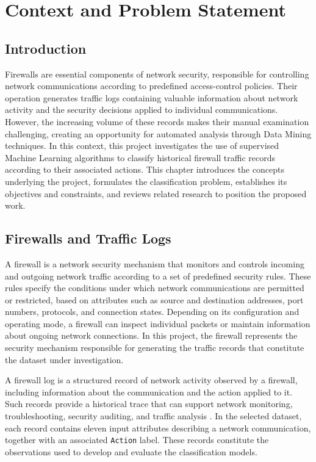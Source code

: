 
\chapter{Context and Problem Statement}
\label{chap:contexte}

\section{Introduction}

Firewalls are essential components of network security, responsible for controlling network communications according to predefined access-control policies. Their operation generates traffic logs containing valuable information about network activity and the security decisions applied to individual communications. However, the increasing volume of these records makes their manual examination challenging, creating an opportunity for automated analysis through Data Mining techniques. In this context, this project investigates the use of supervised Machine Learning algorithms to classify historical firewall traffic records according to their associated actions. This chapter introduces the concepts underlying the project, formulates the classification problem, establishes its objectives and constraints, and reviews related research to position the proposed work.

\section{Firewalls and Traffic Logs}

A firewall is a network security mechanism that monitors and controls incoming and outgoing network traffic according to a set of predefined security rules. These rules specify the conditions under which network communications are permitted or restricted, based on attributes such as source and destination addresses, port numbers, protocols, and connection states. Depending on its configuration and operating mode, a firewall can inspect individual packets or maintain information about ongoing network connections. In this project, the firewall represents the security mechanism responsible for generating the traffic records that constitute the dataset under investigation.

A firewall log is a structured record of network activity observed by a firewall, including information about the communication and the action applied to it. Such records provide a historical trace that can support network monitoring, troubleshooting, security auditing, and traffic analysis \cite{aljabri2022firewall,rahman2023firewall}. In the selected dataset, each record contains eleven input attributes describing a network communication, together with an associated \texttt{Action} label. These records constitute the observations used to develop and evaluate the classification models.

